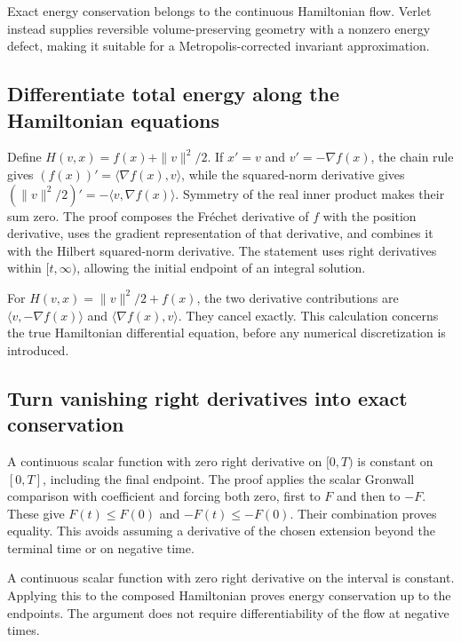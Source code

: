 \documentclass[11pt,a4paper]{report}
\begin{document}
Exact energy conservation belongs to the continuous Hamiltonian flow. Verlet instead supplies reversible volume-preserving geometry with a nonzero energy defect, making it suitable for a Metropolis-corrected invariant approximation.

\subsection{\texorpdfstring{Differentiate total energy along the Hamiltonian equations}{Differentiate total energy along the Hamiltonian equations}}
\label{report-step-KineticLangevin-Hamiltonian-lean-1}


Define \(H(v,x)=f(x)+\|v\|^2/2\). If \(x'=v\) and \(v'=-\nabla f(x)\), the chain rule gives \((f(x))'=\langle\nabla f(x),v\rangle\), while the squared-norm derivative gives \((\|v\|^2/2)'=-\langle v,\nabla f(x)\rangle\). Symmetry of the real inner product makes their sum zero. The proof composes the Fréchet derivative of \(f\) with the position derivative, uses the gradient representation of that derivative, and combines it with the Hilbert squared-norm derivative. The statement uses right derivatives within \([t,\infty)\), allowing the initial endpoint of an integral solution.



For \(H(v,x)=\|v\|^2/2+f(x)\), the two derivative contributions are \(\langle v,-\nabla f(x)\rangle\) and \(\langle\nabla f(x),v\rangle\). They cancel exactly. This calculation concerns the true Hamiltonian differential equation, before any numerical discretization is introduced.

\subsection{\texorpdfstring{Turn vanishing right derivatives into exact conservation}{Turn vanishing right derivatives into exact conservation}}
\label{report-step-KineticLangevin-Hamiltonian-lean-2}


A continuous scalar function with zero right derivative on \([0,T)\) is constant on \([0,T]\), including the final endpoint. The proof applies the scalar Gronwall comparison with coefficient and forcing both zero, first to \(F\) and then to \(-F\). These give \(F(t)\le F(0)\) and \(-F(t)\le-F(0)\). Their combination proves equality. This avoids assuming a derivative of the chosen extension beyond the terminal time or on negative time.



A continuous scalar function with zero right derivative on the interval is constant. Applying this to the composed Hamiltonian proves energy conservation up to the endpoints. The argument does not require differentiability of the flow at negative times.
\end{document}
